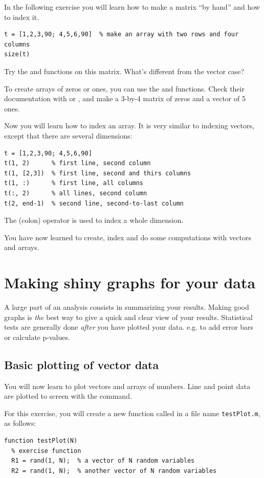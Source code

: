 \documentclass{article}
\begin{document}
In the following exercise you will learn how to make a matrix ``by hand'' and how to index it.
\begin{lstlisting}
t = [1,2,3,90; 4,5,6,90]  % make an array with two rows and four columns
size(t)
\end{lstlisting}

Try the  and  functions on this matrix.
What's different from the vector case?

To create arrays of zeros or ones, you can use the  and  functions.
Check their documentation with  or , and make a 3-by-4 matrix of zeros and a vector of 5 ones.

Now you will learn how to index an array.
It is very similar to indexing vectors, except that there are several dimensions:
\begin{lstlisting}
t = [1,2,3,90; 4,5,6,90]
t(1, 2)      % first line, second column
t(1, [2,3])  % first line, second and thirs columns
t(1, :)      % first line, all columns
t(:, 2)      % all lines, second column
t(2, end-1)  % second line, second-to-last column
\end{lstlisting}
The \mcode{:} (colon) operator is used to index a whole dimension.

You have now learned to create, index and do some computations with vectors and arrays.


\pagebreak
\section{Making shiny graphs for your data}

A large part of an analysis consists in summarizing your results.
Making good graphs is \emph{the} best way to give a quick and clear view of your results.
Statistical tests are generally done \emph{after} you have plotted your data. e.g. to add error bars or calculate p-values.


\subsection{Basic plotting of vector data}

You will now learn to plot vectors and arrays of numbers.
Line and point data are plotted to screen with the  command.

For this exercise, you will create a new function called  in a file name \verb|testPlot.m|, as follows:
\begin{lstlisting}
function testPlot(N)
  % exercise function
  R1 = rand(1, N);  % a vector of N random variables
  R2 = rand(1, N);  % another vector of N random variables
\end{lstlisting}
\end{document}
